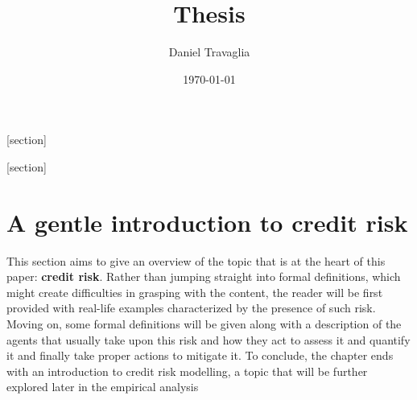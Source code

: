 \documentclass[a4paper,12pt]{article}
\begin{document}

    \setlength{\abovedisplayshortskip}{6pt}
    \setlength{\belowdisplayshortskip}{24pt}
    
    \setlength\parskip{0.5\baselineskip}

    [section]
    \newenvironment{definition}[1][]{\refstepcounter{definition}\par\medskip
        \noindent \textbf{Definition #1:} \rmfamily}{\medskip}

    [section]
    \newenvironment{example}[1][]{\refstepcounter{example}\par\medskip
        \noindent \textbf{Example~\theexample. #1} \rmfamily}{\medskip}

    
    \title{Thesis}
    \author{Daniel Travaglia}
    \date{\today}
    \maketitle

    \pagebreak


    \pagebreak
    
    \section{A gentle introduction to credit risk}

    This section aims to give an overview of the topic that is at the heart of this paper: \textbf{credit risk}. 
    Rather than jumping straight into formal definitions, which might create difficulties in grasping with the content, 
    the reader will be first provided with real-life examples characterized by the presence of such risk. 
    Moving on, some formal definitions will be given along with a description of the agents that usually take upon 
    this risk and how they act to assess it and quantify it and finally take proper actions to mitigate it. 
    To conclude, the chapter ends with an introduction to credit risk modelling, 
    a topic that will be further explored later in the empirical analysis
\end{document}
